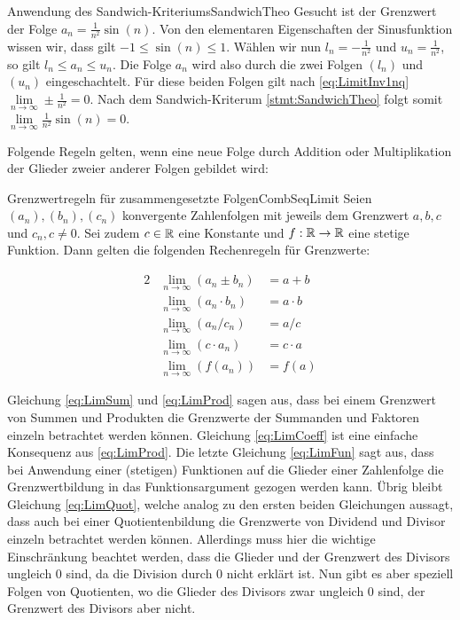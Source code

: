 \begin{example}{Anwendung des Sandwich-Kriteriums}{SandwichTheo}
	Gesucht ist der Grenzwert der Folge $a_n = \frac{1}{n^2}\sin(n)$. Von den elementaren Eigenschaften der Sinusfunktion wissen wir, dass gilt $-1\le\sin(n)\le 1$. Wählen wir nun $l_n = -\frac{1}{n^2}$ und $u_n = \frac{1}{n^2}$, so gilt $l_n \le a_n \le u_n$. Die Folge $a_n$ wird also durch die zwei Folgen $(l_n)$ und $(u_n)$ eingeschachtelt. Für diese beiden Folgen gilt nach \ref{eq:LimitInv1nq} $\lim\limits_{n\to\infty} \pm\frac{1}{n^2} = 0$. Nach dem Sandwich-Kriterum \ref{stmt:SandwichTheo} folgt somit $\lim\limits_{n\to\infty} \frac{1}{n^2}\sin(n) = 0$.
\end{example}

Folgende Regeln gelten, wenn eine neue Folge durch Addition oder Multiplikation der Glieder zweier anderer Folgen gebildet wird:

\begin{statement}{Grenzwertregeln für zusammengesetzte Folgen}{CombSeqLimit}
	Seien $(a_n), (b_n), (c_n)$ konvergente Zahlenfolgen mit jeweils dem Grenzwert $a, b, c$ und $c_n, c \ne 0$. Sei zudem $c \in \mathbb{R}$ eine Konstante und $f: \mathbb{R}\to\mathbb{R}$ eine stetige Funktion. Dann gelten die folgenden Rechenregeln für Grenzwerte:

	\begin{alignat}{2}
		& \lim\limits_{n\to\infty}(a_n \pm b_n) & = a + b \label{eq:LimSum} \\
		& \lim\limits_{n\to\infty}(a_n \cdot b_n) & = a \cdot b \label{eq:LimProd} \\
		& \lim\limits_{n\to\infty}(a_n / c_n) & = a / c \label{eq:LimQuot} \\
		& \lim\limits_{n\to\infty}(c \cdot a_n) & = c \cdot a \label{eq:LimCoeff} \\
		& \lim\limits_{n\to\infty}(f(a_n)) & = f(a)	\label{eq:LimFun}
	\end{alignat}
\end{statement}

Gleichung \ref{eq:LimSum} und \ref{eq:LimProd} sagen aus, dass bei einem Grenzwert von Summen und Produkten die Grenzwerte der Summanden und Faktoren einzeln betrachtet werden können. Gleichung \ref{eq:LimCoeff} ist eine einfache Konsequenz aus \ref{eq:LimProd}. Die letzte Gleichung \ref{eq:LimFun} sagt aus, dass bei Anwendung einer (stetigen) Funktionen auf die Glieder einer Zahlenfolge die Grenzwertbildung in das Funktionsargument gezogen werden kann.	Übrig bleibt Gleichung \ref{eq:LimQuot}, welche analog zu den ersten beiden Gleichungen aussagt, dass auch bei einer Quotientenbildung die Grenzwerte von Dividend und Divisor einzeln betrachtet werden können. Allerdings muss hier die wichtige Einschränkung beachtet werden, dass die Glieder und der Grenzwert des Divisors ungleich $0$ sind, da die Division durch $0$ nicht erklärt ist. Nun gibt es aber speziell Folgen von Quotienten, wo die Glieder des Divisors zwar ungleich $0$ sind, der Grenzwert des Divisors aber nicht.

